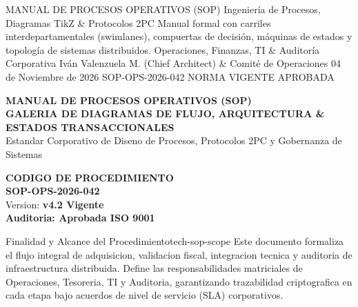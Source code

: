 \documentclass[11pt,a4paper]{article}
\begin{document}
\makecorporatedarkcover%
  {MANUAL DE PROCESOS OPERATIVOS (SOP)}%
  {Ingenier\'ia de Procesos, Diagramas TikZ \& Protocolos 2PC}%
  {Manual formal con carriles interdepartamentales (swimlanes), compuertas de decisi\'on, m\'aquinas de estados y topolog\'ia de sistemas distribuidos.}%
  {Operaciones, Finanzas, TI \& Auditor\'ia Corporativa}%
  {Iv\'an Valenzuela M. (Chief Architect) \& Comit\'e de Operaciones}%
  {04 de Noviembre de 2026}%
  {SOP-OPS-2026-042}%
  {NORMA VIGENTE APROBADA}




\drawchromaticbar[3.5pt]
\vspace{2.5mm}

\noindent
\begin{minipage}[t]{0.65\textwidth}
  {\fontsize{16}{20}\selectfont\bfseries\color{corpPrimary}MANUAL DE PROCESOS OPERATIVOS (SOP)}\\[2pt]
  {\small\bfseries\color{corpTextAccent}GALERIA DE DIAGRAMAS DE FLUJO, ARQUITECTURA \& ESTADOS TRANSACCIONALES}\\[3pt]
  {\footnotesize\color{corpTextMuted}Estandar Corporativo de Diseno de Procesos, Protocolos 2PC y Gobernanza de Sistemas}
\end{minipage}\hfill
\begin{minipage}[t]{0.32\textwidth}
  \raggedleft
  \begin{tcolorbox}[
    enhanced,
    colback=corpLightBg,
    colframe=corpBorder,
    arc=2mm,
    boxrule=0.7pt,
    top=2mm, bottom=2mm, left=3mm, right=3mm
  ]
    \raggedleft
    {\scriptsize\bfseries\color{corpTextMuted}CODIGO DE PROCEDIMIENTO}\\[1pt]
    {\normalsize\bfseries\color{corpPrimary}SOP-OPS-2026-042}\\[2pt]
    {\scriptsize\color{corpTextDark}Version: \textbf{v4.2 Vigente}}\\[1pt]
    {\scriptsize\color{corpSuccess}\textbf{Auditoria: Aprobada ISO 9001}}
  \end{tcolorbox}
\end{minipage}

\vspace{2mm}

\begin{corptech}{Finalidad y Alcance del Procedimiento}{tech-sop-scope}
  Este documento formaliza el flujo integral de adquisicion, validacion fiscal, integracion tecnica y auditoria de infraestructura distribuida. Define las responsabilidades matriciales de Operaciones, Tesoreria, TI y Auditoria, garantizando trazabilidad criptografica en cada etapa bajo acuerdos de nivel de servicio (SLA) corporativos.
\end{corptech}
\end{document}
